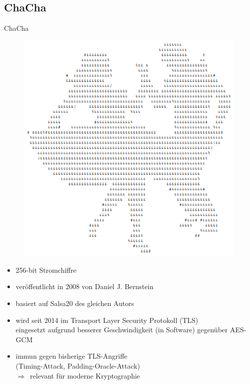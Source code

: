 \documentclass{beamer}
\begin{document}
\subsection{ChaCha}
\begin{frame}{ChaCha}
\renewcommand*{\thefootnote}{\fnsymbol{footnote}}
\begin{figure}
\center
\begin{minipage}{.25\textwidth}
\includegraphics[width=\textwidth]{figures/chacha-ascii-art/chacha-ascii-art.png}
\end{minipage}
\end{figure}
\begin{itemize}
\item 256-bit Stromchiffre
\item veröffentlicht in 2008 von Daniel J. Bernstein
\item basiert auf Salsa20 des gleichen Autors
\item wird seit 2014 im Transport Layer Security Protokoll (TLS) \\eingesetzt aufgrund besserer Geschwindigkeit (in Software) gegenüber AES-GCM
\item immun gegen bisherige TLS-Angriffe \\(Timing-Attack, Padding-Oracle-Attack)\\ $\Rightarrow$\ relevant für moderne Kryptographie
\end{itemize}
\end{frame}
\end{document}
